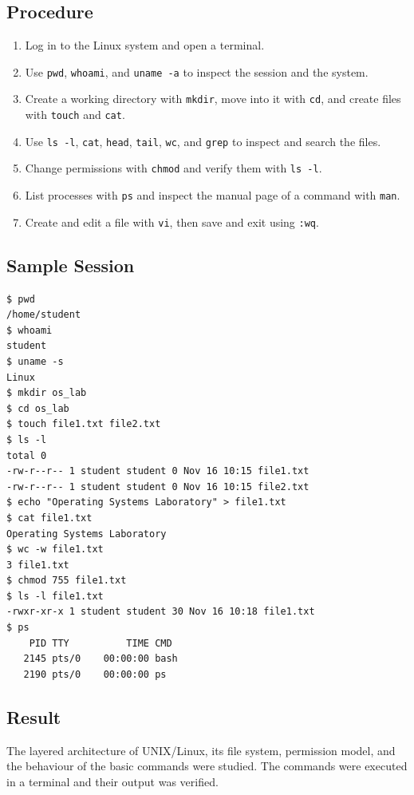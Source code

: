 \subsection*{Procedure}
\begin{enumerate}
    \item Log in to the Linux system and open a terminal.
    \item Use \texttt{pwd}, \texttt{whoami}, and \texttt{uname -a} to inspect the session and the system.
    \item Create a working directory with \texttt{mkdir}, move into it with \texttt{cd}, and create files with \texttt{touch} and \texttt{cat}.
    \item Use \texttt{ls -l}, \texttt{cat}, \texttt{head}, \texttt{tail}, \texttt{wc}, and \texttt{grep} to inspect and search the files.
    \item Change permissions with \texttt{chmod} and verify them with \texttt{ls -l}.
    \item List processes with \texttt{ps} and inspect the manual page of a command with \texttt{man}.
    \item Create and edit a file with \texttt{vi}, then save and exit using \texttt{:wq}.
\end{enumerate}

\subsection*{Sample Session}
\begin{lstlisting}[style=outputstyle, caption={A short terminal session using basic UNIX/Linux commands}]
$ pwd
/home/student
$ whoami
student
$ uname -s
Linux
$ mkdir os_lab
$ cd os_lab
$ touch file1.txt file2.txt
$ ls -l
total 0
-rw-r--r-- 1 student student 0 Nov 16 10:15 file1.txt
-rw-r--r-- 1 student student 0 Nov 16 10:15 file2.txt
$ echo "Operating Systems Laboratory" > file1.txt
$ cat file1.txt
Operating Systems Laboratory
$ wc -w file1.txt
3 file1.txt
$ chmod 755 file1.txt
$ ls -l file1.txt
-rwxr-xr-x 1 student student 30 Nov 16 10:18 file1.txt
$ ps
    PID TTY          TIME CMD
   2145 pts/0    00:00:00 bash
   2190 pts/0    00:00:00 ps
\end{lstlisting}

\subsection*{Result}
The layered architecture of UNIX/Linux, its file system, permission model, and the behaviour of the basic commands were studied. The commands were executed in a terminal and their output was verified.
